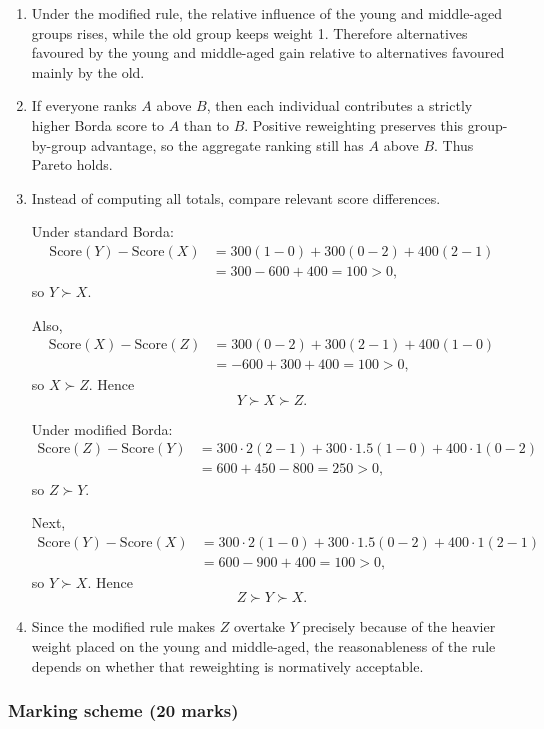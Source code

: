 \documentclass[12pt]{article}
\begin{document}
\begin{enumerate}[label=(\alph*)]
    \item
    Under the modified rule, the relative influence of the young and middle-aged groups rises, while the old group keeps weight 1. Therefore alternatives favoured by the young and middle-aged gain relative to alternatives favoured mainly by the old.

    \item
    If everyone ranks \(A\) above \(B\), then each individual contributes a strictly higher Borda score to \(A\) than to \(B\). Positive reweighting preserves this group-by-group advantage, so the aggregate ranking still has \(A\) above \(B\). Thus Pareto holds.

    \item
    Instead of computing all totals, compare relevant score differences.

    Under standard Borda:
    \[
    \begin{aligned}
    \text{Score}(Y)-\text{Score}(X)
    &=300(1-0)+300(0-2)+400(2-1)\\
    &=300-600+400=100>0,
    \end{aligned}
    \]
    so \(Y\succ X\).

    Also,
    \[
    \begin{aligned}
    \text{Score}(X)-\text{Score}(Z)
    &=300(0-2)+300(2-1)+400(1-0)\\
    &=-600+300+400=100>0,
    \end{aligned}
    \]
    so \(X\succ Z\). Hence
    \[
    \boxed{Y \succ X \succ Z.}
    \]

    Under modified Borda:
    \[
    \begin{aligned}
    \text{Score}(Z)-\text{Score}(Y)
    &=300\cdot 2(2-1)+300\cdot 1.5(1-0)+400\cdot 1(0-2)\\
    &=600+450-800=250>0,
    \end{aligned}
    \]
    so \(Z\succ Y\).

    Next,
    \[
    \begin{aligned}
    \text{Score}(Y)-\text{Score}(X)
    &=300\cdot 2(1-0)+300\cdot 1.5(0-2)+400\cdot 1(2-1)\\
    &=600-900+400=100>0,
    \end{aligned}
    \]
    so \(Y\succ X\). Hence
    \[
    \boxed{Z \succ Y \succ X.}
    \]

    \item
    Since the modified rule makes \(Z\) overtake \(Y\) precisely because of the heavier weight placed on the young and middle-aged, the reasonableness of the rule depends on whether that reweighting is normatively acceptable.
\end{enumerate}
\newpage\subsubsection{Marking scheme (20 marks)}
\end{document}
